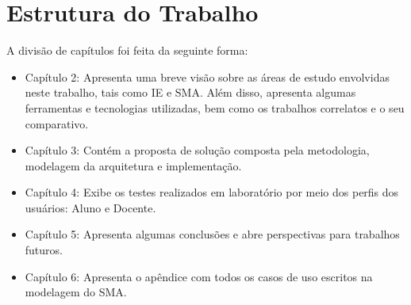 \section{Estrutura do Trabalho}
A divisão de capítulos foi feita da seguinte forma:
\begin{itemize}
	\item Capítulo 2: Apresenta uma breve visão sobre as áreas de estudo envolvidas neste trabalho, tais como IE e SMA. Além disso, apresenta algumas ferramentas e tecnologias utilizadas, bem como os trabalhos correlatos e o seu comparativo.
	\item Capítulo 3: Contém a proposta de solução composta pela metodologia, modelagem da arquitetura e implementação.
	\item Capítulo 4: Exibe os testes realizados em laboratório por meio dos perfis dos usuários: Aluno e Docente.
	\item Capítulo 5: Apresenta algumas conclusões e abre perspectivas para trabalhos futuros.
	\item Capítulo 6: Apresenta o apêndice com todos os casos de uso escritos na modelagem do SMA.
\end{itemize}
